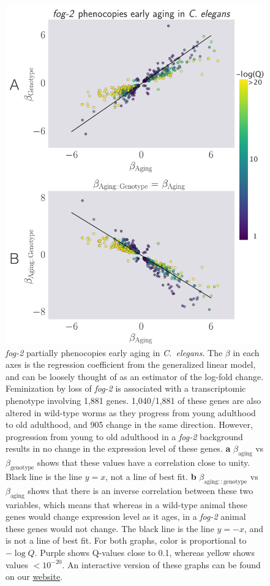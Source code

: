 \documentclass[9pt,twocolumn,twoside]{gsag3jnl}
\newcommand{\cel}{\emph{C.~elegans}}
\newcommand{\fog}{\emph{fog-2}}
\newcommand{\fogn}{1,881}
\newcommand{\coexpressed}{905}
\newcommand{\intersectn}{1,040}
\newcommand{\webref}{
\href{https://wormlabcaltech.github.io/Angeles_Leighton_2016/}{website}}
\begin{document}
\begin{figure}
\renewcommand{\familydefault}{\sfdefault}\normalfont{}
\centering
\includegraphics[width=\linewidth]{../output/figs/final_figs/aberrant_aging.pdf}
\caption{ \fog{} partially phenocopies early aging in \cel{}. The $\beta$ in each axes is the regression coefficient from the generalized linear model, and can be loosely thought of as an estimator of the log-fold change.
Feminization by loss of \fog{} is associated with a transcriptomic phenotype involving \fogn{} genes. \intersectn{}/\fogn{} of these genes are also altered in wild-type worms as they progress from young adulthood to old adulthood, and \coexpressed{} change in the same direction. However, progression from young to old adulthood in a \fog{} background results in no change in the expression level of these genes. \textbf{a} $\beta_\mathrm{aging}$ vs $\beta_\mathrm{genotype}$ shows that these values have a correlation close to unity. Black line is the line $y=x$, not a line of best fit. \textbf{b} $\beta_\mathrm{aging::genotype}$ vs $\beta_\mathrm{aging}$ shows that there is an inverse correlation between these two variables, which means that whereas in a wild-type animal these genes would change expression level as it ages, in a \fog{} animal these genes would not change.
The black line is the line $y=-x$, and is not a line of best fit. For both graphs, color is proportional to $-\log{Q}$. Purple shows Q-values close to 0.1, whereas yellow shows values $<10^{-20}$.
An interactive version of these graphs can be found on our \webref{}.
}%
\label{fig:aberrant_aging}
\end{figure}
\end{document}
